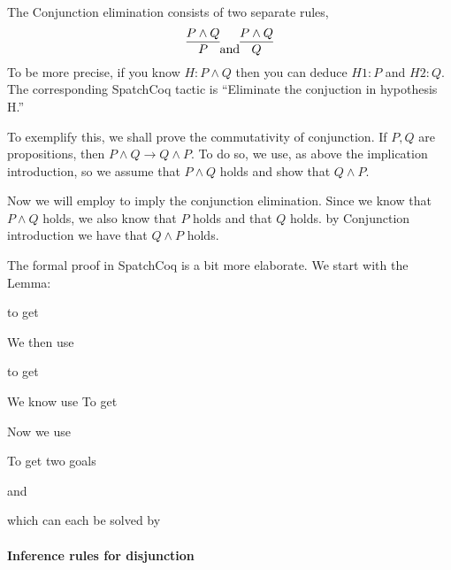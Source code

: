 \begin{itemize}
The Conjunction elimination consists of  two separate rules,
$$\infer{P}{P\land Q} \mbox{and} \infer{Q}{P\land Q}$$ To be more precise, if you know $H:P\land Q$ then you can deduce $H1:P$ and $H2:Q$. The corresponding SpatchCoq tactic is ``Eliminate the conjuction in hypothesis H.''

To exemplify this, we shall prove the commutativity of conjunction.
If $P,Q$ are propositions, then $P\land Q \rightarrow Q \land P$. To do so, we use, as above the implication introduction, so we assume that $P\land Q$ holds and show that $Q\land P$. 

Now we will employ to imply the conjunction elimination. Since we know that $P\land Q$ holds, we also know that $P$ holds and that $Q$ holds. by Conjunction introduction we have that $Q\land P$ holds.

The formal proof in SpatchCoq is a bit more elaborate. We start with the Lemma:

to get 

We then use

to get

We know use
To get

Now we use 


To get two goals

and


which can each be solved by






\paragraph{Inference rules for disjunction}


\end{itemize}
